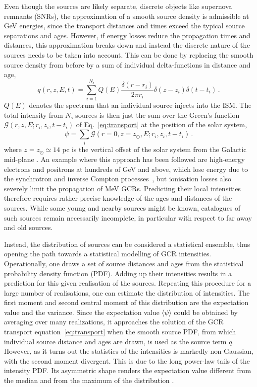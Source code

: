 \documentclass[%
reprint,
amsmath,amssymb,
aps,
superscriptaddress,
preprintnumbers
]{revtex4-2}
\begin{document}
Even though the sources are likely separate, discrete objects like supernova remnants (SNRs), the approximation of a smooth source density is admissible at GeV energies, since the transport distances and times exceed the typical source separations and ages. However, if energy losses reduce the propagation times and distances, this approximation breaks down and instead the discrete nature of the sources needs to be taken into account. This can be done by replacing the smooth source density from before by a sum of individual delta-functions in distance and age,
%
\begin{equation}
q(r, z, E, t) = \sum_{i=1}^{N_\text{s}} Q(E)\frac{\delta(r - r_i)}{2\pi r_i}\delta(z-z_i)\delta(t - t_i) \, .
\end{equation}
%
$Q(E)$ denotes the spectrum that an individual source injects into the ISM. The total intensity from $N_{\text{s}}$ sources is then just the sum over the Green's function $\mathcal{G}(r, z, E; r_i, z_i, t-t_i)$ of Eq.~\eqref{eq:transport} at the position of the solar system,
%
\begin{equation}
\psi = \sum_i \mathcal{G}(r=0, z=z_\odot, E; r_i, z_i, t-t_i) \, . \label{eq:stochasticity}
\end{equation}
%
where $z=z_{\odot}\simeq 14$ pc is the vertical offset of the solar system from the Galactic mid-plane \cite{skowron2019}. An example where this approach has been followed are high-energy electrons and positrons at hundreds of GeV and above, which lose energy due to the synchrotron and inverse Compton processes~\cite{mertsch2011}, but ionisation losses also severely limit the propagation of MeV GCRs. Predicting their local intensities therefore requires rather precise knowledge of the ages and distances of the sources. While some young and nearby sources might be known, catalogues of such sources remain necessarily incomplete, in particular with respect to far away and old sources.

Instead, the distribution of sources can be considered a statistical ensemble, thus opening the path towards a statistical modelling of GCR intensities. Operationally, one draws a set of source distances and ages from the statistical probability density function (PDF). Adding up their intensities results in a prediction for this given realisation of the sources. Repeating this procedure for a large number of realisations, one can estimate the distribution of intensities. The first moment and second central moment of this distribution are the expectation value and the variance. Since the expectation value $\langle \psi \rangle$ could be obtained by averaging over many realizations, it approaches the solution of the GCR transport equation~\eqref{eq:transport} when the smooth source PDF, from which individual source distance and ages are drawn, is used as the source term $q$. However, as it turns out the statistics of the intensities is markedly non-Gaussian, with the second moment divergent. This is due to the long power-law tails of the intensity PDF. Its asymmetric shape renders the expectation value different from the median and from the maximum of the distribution \cite{nolan2020}.
\end{document}
